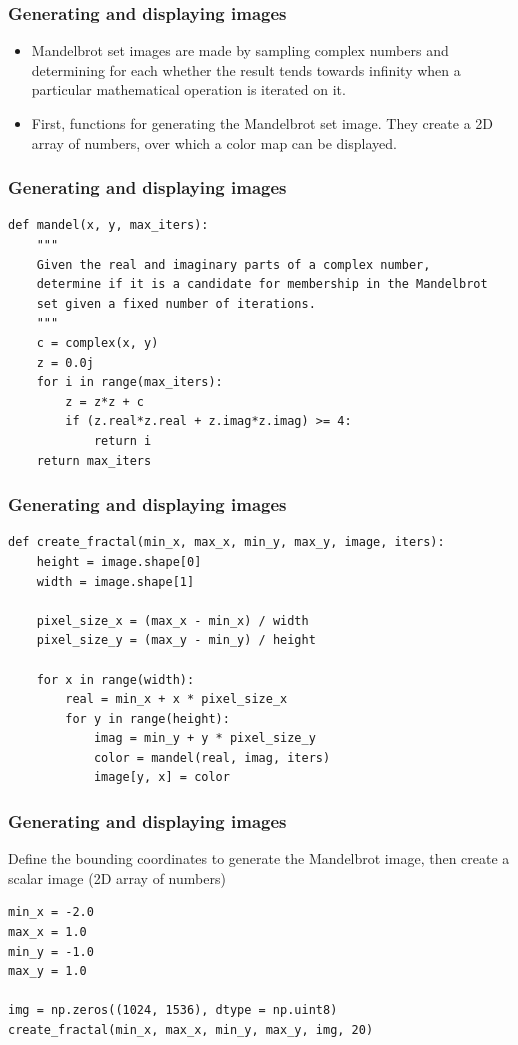 \begin{frame}[fragile] \frametitle{Generating and displaying images}
\begin{itemize}
\item Mandelbrot set images are made by sampling complex numbers and determining for each whether the result tends towards infinity when a particular mathematical operation is iterated on it.
\item First, functions for generating the Mandelbrot set image. They create a 2D array of numbers, over which a color map can be displayed.
\end{itemize}
\end{frame}

\begin{frame}[fragile] \frametitle{Generating and displaying images}
\begin{lstlisting}
def mandel(x, y, max_iters):
    """
    Given the real and imaginary parts of a complex number,
    determine if it is a candidate for membership in the Mandelbrot
    set given a fixed number of iterations.
    """
    c = complex(x, y)
    z = 0.0j
    for i in range(max_iters):
        z = z*z + c
        if (z.real*z.real + z.imag*z.imag) >= 4:
            return i
    return max_iters
\end{lstlisting}
\end{frame}

\begin{frame}[fragile] \frametitle{Generating and displaying images}
\begin{lstlisting}
def create_fractal(min_x, max_x, min_y, max_y, image, iters):
    height = image.shape[0]
    width = image.shape[1]

    pixel_size_x = (max_x - min_x) / width
    pixel_size_y = (max_y - min_y) / height

    for x in range(width):
        real = min_x + x * pixel_size_x
        for y in range(height):
            imag = min_y + y * pixel_size_y
            color = mandel(real, imag, iters)
            image[y, x] = color
\end{lstlisting}
\end{frame}

\begin{frame}[fragile] \frametitle{Generating and displaying images}
Define the bounding coordinates to generate the Mandelbrot image, then create a scalar image (2D array of numbers)
\begin{lstlisting}
min_x = -2.0
max_x = 1.0
min_y = -1.0
max_y = 1.0

img = np.zeros((1024, 1536), dtype = np.uint8)
create_fractal(min_x, max_x, min_y, max_y, img, 20)
\end{lstlisting}
\end{frame}


